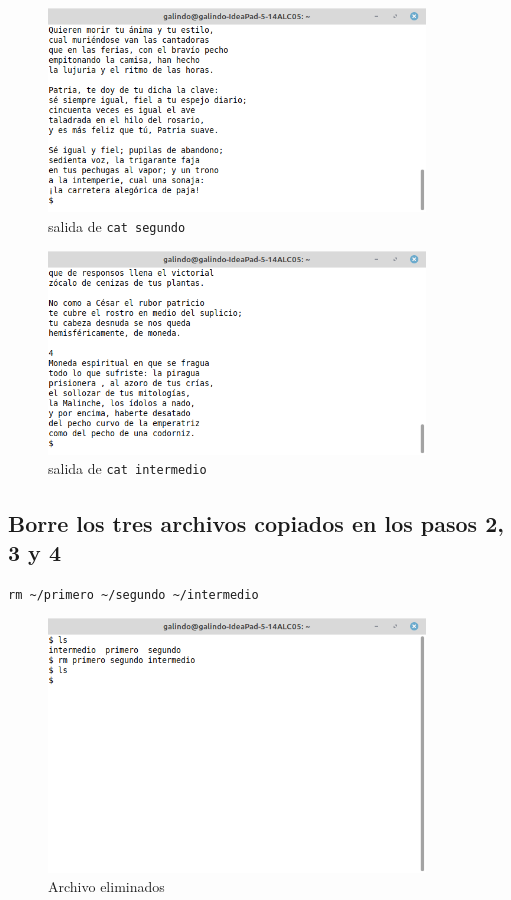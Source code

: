 \documentclass[11pt]{article}
\begin{document}
\begin{figure}[htbp]
\centering
\includegraphics[width=10cm]{img/segundo.png}
\caption[\texttt{cat segundo}]{salida de \texttt{cat segundo}}
\end{figure}

\begin{figure}[htbp]
\centering
\includegraphics[width=10cm]{img/intermedio.png}
\caption[\texttt{cat intermedio}]{salida de \texttt{cat intermedio}}
\end{figure}

\cite{linux_cat}

\pagebreak

\subsection{Borre los tres archivos copiados en los pasos 2, 3 y 4}
\label{sec:orgf6946fa}
\begin{verbatim}
rm ~/primero ~/segundo ~/intermedio
\end{verbatim}

\begin{figure}[htbp]
\centering
\includegraphics[width=10cm]{img/a5.png}
\caption{Archivo eliminados}
\end{figure}
\end{document}

